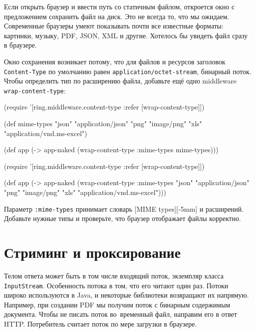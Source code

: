 Если открыть браузер и ввести путь со статичным файлом, откроется окно с
предложением сохранить файл на диск. Это не всегда то, что мы
ожидаем. Современные браузеры умеют показывать почти все известные форматы:
картинки, музыку, PDF, JSON, XML и другие. Хотелось бы увидеть файл сразу в
браузере.

Окно сохранения возникает потому, что для файлов и ресурсов заголовок
\verb|Content-Type| по умолчанию равен \verb|application/octet-stream|,
бинарный поток. Чтобы определить тип по расширению файла, добавьте ещё одно
middleware \verb|wrap-content-type|:

\ifx\DEVICETYPE\MOBILE

\begin{english}
  \begin{clojure}
(require '[ring.middleware.content-type
           :refer [wrap-content-type]])

(def mime-types
      {"json" "application/json"
       "png" "image/png"
       "xls" "application/vnd.ms-excel"})

(def app
  (-> app-naked
      (wrap-content-type
        {:mime-types mime-types})))
  \end{clojure}
\end{english}

\else

\begin{english}
  \begin{clojure}
(require '[ring.middleware.content-type
           :refer [wrap-content-type]])

(def app
  (-> app-naked
      (wrap-content-type
       {:mime-types
         {"json" "application/json"
          "png" "image/png"
          "xls" "application/vnd.ms-excel"}})))
  \end{clojure}
\end{english}

\fi

Параметр \verb|:mime-types| принимает словарь
[MIME types][-5mm] и
расширений. Добавьте нужные типы и проверьте, что браузер отображает файлы
корректно.


\section{Стриминг и проксирование}

Телом ответа может быть в том числе входящий поток, экземпляр класса
\verb|InputStream|. Особенность потока в том, что его читают один раз. Потоки
широко используются в Java, и некоторые библиотеки возвращают их
напрямую. Например, при создании PDF мы получим поток с бинарным содержимым
документа. Чтобы не писать поток во~временный файл, направим его в ответ
HTTP. Потребитель считает поток по мере загрузки в браузере.

